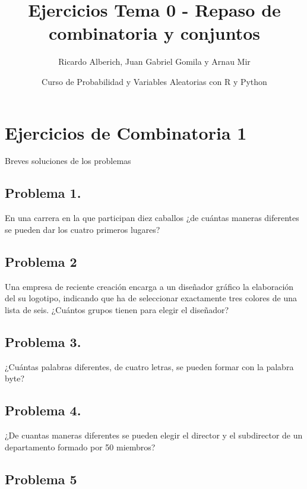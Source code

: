 \documentclass[
]{article}
\title{Ejercicios Tema 0 - Repaso de combinatoria y conjuntos}
\author{Ricardo Alberich, Juan Gabriel Gomila y Arnau Mir}
\date{Curso de Probabilidad y Variables Aleatorias con R y Python}
\begin{document}
\maketitle

{
\hypersetup{linkcolor=blue}
\setcounter{tocdepth}{2}
\tableofcontents
}
\hypertarget{ejercicios-de-combinatoria-1}{%
\section{Ejercicios de Combinatoria
1}\label{ejercicios-de-combinatoria-1}}

Breves soluciones de los problemas

\hypertarget{problema-1.}{%
\subsection{Problema 1.}\label{problema-1.}}

En una carrera en la que participan diez caballos ¿de cuántas maneras
diferentes se pueden dar los cuatro primeros lugares?

\hypertarget{problema-2}{%
\subsection{Problema 2}\label{problema-2}}

Una empresa de reciente creación encarga a un diseñador gráfico la
elaboración del su logotipo, indicando que ha de seleccionar exactamente
tres colores de una lista de seis. ¿Cuántos grupos tienen para elegir el
diseñador?

\hypertarget{problema-3.}{%
\subsection{Problema 3.}\label{problema-3.}}

¿Cuántas palabras diferentes, de cuatro letras, se pueden formar con la
palabra byte?

\hypertarget{problema-4.}{%
\subsection{Problema 4.}\label{problema-4.}}

¿De cuantas maneras diferentes se pueden elegir el director y el
subdirector de un departamento formado por 50 miembros?

\hypertarget{problema-5}{%
\subsection{Problema 5}\label{problema-5}}
\end{document}
